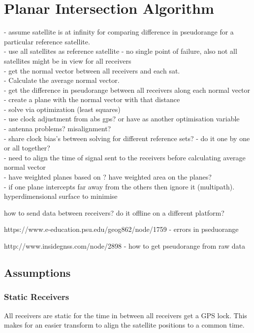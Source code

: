 \documentclass[11pt,a4paper]{article}
\begin{document}
\section{Planar Intersection Algorithm}

- assume satellite is at infinity for comparing difference in pseudorange for a particular reference satellite.\\
- use all satellites as reference satellite - no single point of failure, also not all satellites might be in view for all receivers\\
- get the normal vector between all receivers and each sat. \\
- Calculate the average normal vector.\\
- get the difference in pseudorange between all receivers along each normal vector \\
- create a plane with the normal vector with that distance\\
- solve via optimization (least squares) \\
- use clock adjustment from abs gps? or have as another optimisation variable\\
- antenna problems? misalignment?\\
- share clock bias's between solving for different reference sets? - do it one by one or all together?\\
- need to align the time of signal sent to the receivers before calculating average normal vector\\

- have weighted planes based on ? have weighted area on the planes?\\
- if one plane intercepts far away from the others then ignore it (multipath). hyperdimensional surface to minimise




how to send data between receivers? do it offline on a different platform?


https://www.e-education.psu.edu/geog862/node/1759 - errors in pseduorange

http://www.insidegnss.com/node/2898 - how to get pseudorange from raw data

\subsection{Assumptions}
\subsubsection{Static Receivers}
All receivers are static for the time in between all receivers get a GPS lock. This makes for an easier transform to align the satellite positions to a common time.
\end{document}
